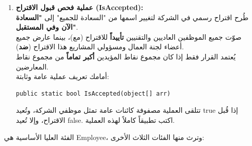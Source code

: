 \documentclass[14pt]{extarticle}
\begin{document}
\begin{enumerate}[label=\textbf{\alph*.} , itemsep=2.5em]
    \item \textbf{عملية فحص قبول الاقتراح (\textenglish{IsAccepted}):} \\
    طُرح اقتراح رسمي في الشركة لتغيير اسمها من "السعادة للجميع" إلى \textbf{"السعادة الآن وفي المستقبل"}. \\
    صوّت جميع الموظفين العاديين والتقنيين \textbf{تأييداً} للاقتراح (مع)، بينما عارض جميع أعضاء لجنة العمال ومسؤولي المشاريع هذا الاقتراح (\textbf{ضد}). \\
    يُعتمد القرار فقط إذا كان مجموع نقاط المؤيدين \textbf{أكبر تماماً} من مجموع نقاط المعارضين. \\
    أمامك تعريف عملية عامة وثابتة:
\begin{boxCode}
\begin{english}
\begin{verbatim}
public static bool IsAccepted(object[] arr)
\end{verbatim}
\end{english}
\end{boxCode}
    تتلقى العملية مصفوفة كائنات عامة تمثل موظفي الشركة، وتُعيد \textenglish{true} إذا قُبل الاقتراح، وإلا تُعيد \textenglish{false}. اكتب تطبيقاً كاملاً لهذه العملية.

\end{enumerate}


\ifwithsols
\clearpage

\begin{boxSolution}
الفئة العليا الأساسية هي \textenglish{Employee}، وترث منها الفئات الثلاث الأخرى:

\begin{center}
\end{center}
\end{boxSolution}
\end{document}
